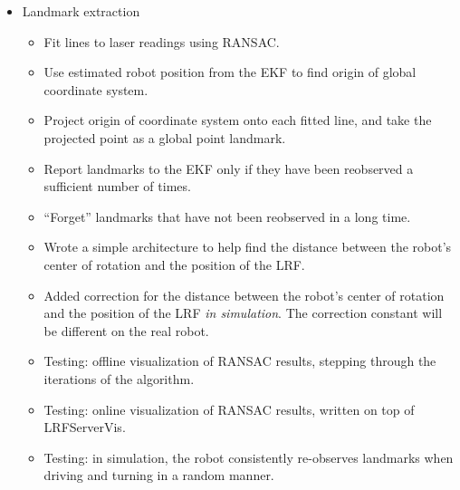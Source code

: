 \documentclass[12pt]{article}
\begin{document}
\begin{itemize}
    \setlength{\itemsep}{0pt}
    \setlength{\parskip}{0pt}
    \setlength{\parsep}{0pt}
    \item Landmark extraction
    \begin{itemize}
        \setlength{\itemsep}{0pt}
        \setlength{\parskip}{0pt}
        \setlength{\parsep}{0pt}
        \item Fit lines to laser readings using RANSAC.
        \item Use estimated robot position from the EKF to find origin of
              global coordinate system.
        \item Project origin of coordinate system onto each fitted line, and
              take the projected point as a global point landmark.
        \item Report landmarks to the EKF only if they have been reobserved a
              sufficient number of times.
        \item ``Forget'' landmarks that have not been reobserved in a long time.
        \item Wrote a simple architecture to help find the distance between the
              robot's center of rotation and the position of the LRF.
        \item Added correction for the distance between the robot's center of
              rotation and the position of the LRF \emph{in simulation}. The
              correction constant will be different on the real robot.
        \item Testing: offline visualization of RANSAC results, stepping through
              the iterations of the algorithm.
        \item Testing: online visualization of RANSAC results, written on top of
              LRFServerVis.
        \item Testing: in simulation, the robot consistently re-observes
              landmarks when driving and turning in a random manner.
    \end{itemize}
    

\end{itemize}
\end{document}
